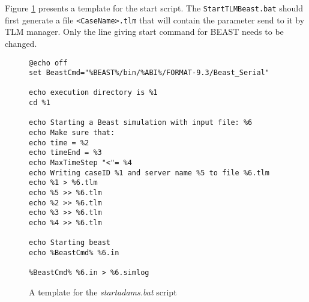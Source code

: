Figure \ref{figStartBeast} presents a template for the start script.
The \verb!StartTLMBeast.bat! should first generate a file \verb!<CaseName>.tlm! that will contain the parameter send to it by TLM manager.
Only the line giving start command for BEAST needs to be changed.

\begin{figure}[h]
\small{
\begin{verbatim}
@echo off
set BeastCmd="%BEAST%/bin/%ABI%/FORMAT-9.3/Beast_Serial"

echo execution directory is %1
cd %1

echo Starting a Beast simulation with input file: %6
echo Make sure that:
echo time = %2
echo timeEnd = %3
echo MaxTimeStep "<"= %4
echo Writing caseID %1 and server name %5 to file %6.tlm
echo %1 > %6.tlm
echo %5 >> %6.tlm
echo %2 >> %6.tlm
echo %3 >> %6.tlm
echo %4 >> %6.tlm

echo Starting beast
echo %BeastCmd% %6.in

%BeastCmd% %6.in > %6.simlog
\end{verbatim}
}
\caption{A template for the \emph{startadams.bat} script\label{figStartBeast}}
\end{figure}


